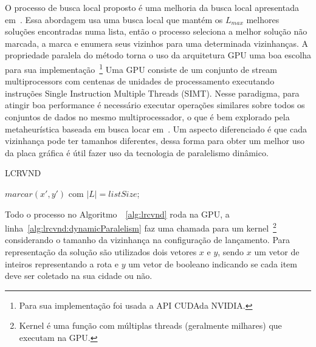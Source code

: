 O processo de busca local proposto é uma melhoria da busca local apresentada em~\cite{araujo:2009}.
Essa abordagem usa uma busca local que mantém os $L_{max}$ melhores soluções encontradas numa lista, então o processo seleciona a melhor solução não marcada, a marca e enumera seus vizinhos para uma determinada vizinhanças.
A propriedade paralela do método torna o uso da arquitetura GPU uma boa escolha para sua implementação~\footnote{Para sua implementação foi usada a API CUDA\texttrademark da NVIDIA\texttrademark.}
Uma GPU consiste de um conjunto de stream multiprocessors com centenas de unidades de processamento executando instruções Single Instruction Multiple Threads (SIMT). Nesse paradigma, para atingir boa performance é necessário executar operações similares sobre todos os conjuntos de dados no mesmo multiprocessador, o que é bem explorado pela metaheurística baseada em busca locar em~\cite{Coelho:2017}. 
Um aspecto diferenciado é que cada vizinhança pode ter tamanhos diferentes, dessa forma para obter um melhor uso da placa gráfica é útil fazer uso da tecnologia de paralelismo dinâmico.%

\begin{algorithm}[htpb]
\caption{LCRVND}
\label{alg:lrcvnd}
\begin{algorithmic}[1]
         
            \State $marcar(x',y')$
            \For{$\lambda \in \Lambda$}
                 \label{alg:lrcvnd:dynamicParalelism} 
                 com $|L|=listSize$; 
            \EndFor
        \EndWhile
    \EndFunction
\end{algorithmic}
\end{algorithm}

Todo o processo no Algoritmo~~\ref{alg:lrcvnd} roda na GPU, a linha~\ref{alg:lrcvnd:dynamicParalelism} faz uma chamada para um kernel~\footnote{Kernel é uma função com múltiplas threads (geralmente milhares) que executam na GPU.} considerando o tamanho da vizinhança na configuração de lançamento.
Para representação da solução são utilizados dois vetores $x$ e $y$, sendo $x$ um vetor de inteiros representando a rota e $y$ um vetor de booleano indicando se cada item deve ser coletado na sua cidade ou não.

